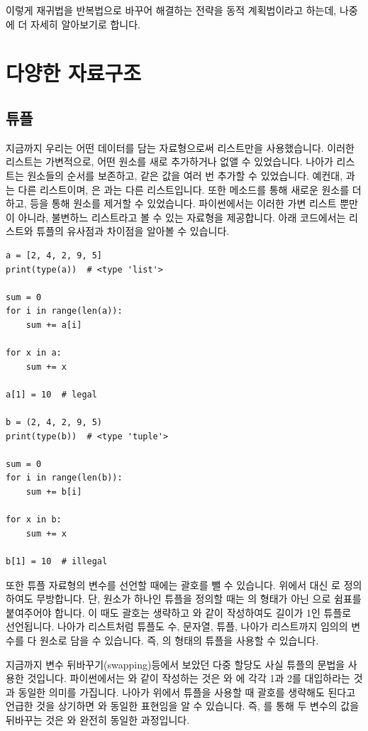 \documentclass[../main.tex]{subfiles}
\begin{document}
이렇게 재귀법을 반복법으로 바꾸어 해결하는 전략을 동적 계획법이라고 하는데, 나중에 더 자세히 알아보기로 합니다.

\section{다양한 자료구조}
\subsection{튜플}
지금까지 우리는 어떤 데이터를 담는 자료형으로써 리스트만을 사용했습니다.
이러한 리스트는 가변적으로, 어떤 원소를 새로 추가하거나 없앨 수 있었습니다.
나아가 리스트는 원소들의 순서를 보존하고, 같은 값을 여러 번 추가할 수 있었습니다.
예컨대, \pyin{[1, 2, 1]}과 \pyin{[1, 1, 2]}는 다른 리스트이며, \pyin{[1, 1, 1]}은 \pyin{[1]}과는 다른 리스트입니다.
또한  메소드를 통해 새로운 원소를 더하고,  등을 통해 원소를 제거할 수 있었습니다.
파이썬에서는 이러한 가변 리스트 뿐만이 아니라, 불변하느 리스트라고 볼 수 있는  자료형을 제공합니다.
아래 코드에서는 리스트와 튜플의 유사점과 차이점을 알아볼 수 있습니다.
\begin{verbatim}
a = [2, 4, 2, 9, 5]
print(type(a))  # <type 'list'>

sum = 0
for i in range(len(a)):
    sum += a[i]

for x in a:
    sum += x

a[1] = 10  # legal

b = (2, 4, 2, 9, 5)
print(type(b))  # <type 'tuple'>

sum = 0
for i in range(len(b)):
    sum += b[i]

for x in b:
    sum += x

b[1] = 10  # illegal
\end{verbatim}

또한 튜플 자료형의 변수를 선언할 때에는 괄호를 뺄 수 있습니다.
위에서  대신 로 정의하여도 무방합니다.
단, 원소가 하나인 튜플을 정의할 때는 의 형태가 아닌 으로 쉼표를 붙여주어야 합니다.
이 때도 괄호는 생략하고 와 같이 작성하여도 길이가 1인 튜플로 선언됩니다.
나아가 리스트처럼 튜플도 수, 문자열, 튜플, 나아가 리스트까지 임의의 변수를 다 원소로 담을 수 있습니다.
즉, 의 형태의 튜플을 사용할 수 있습니다.

지금까지 변수 뒤바꾸기(swapping)등에서 보았던 다중 할당도 사실 튜플의 문법을 사용한 것입니다.
파이썬에서는 와 같이 작성하는 것은 와 에 각각 1과 2를 대입하라는 것과 동일한 의미를 가집니다.
나아가 위에서 튜플을 사용할 때 괄호를 생략해도 된다고 언급한 것을 상기하면 와 동일한 표현임을 알 수 있습니다.
즉, 를 통해 두 변수의 값을 뒤바꾸는 것은 와 완전히 동일한 과정입니다.
\end{document}
